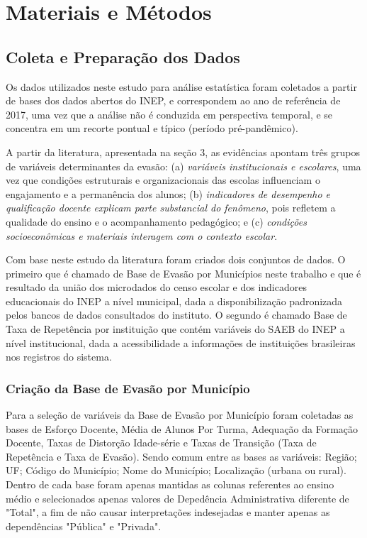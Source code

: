 \documentclass[english, spanish, brazilian]{RBIEarticle} %
\begin{document}
\section{Materiais e Métodos}

\subsection{Coleta e Preparação dos Dados}

Os dados utilizados neste estudo para análise estatística foram coletados a partir de bases dos  dados abertos do INEP, e correspondem ao ano de referência de 2017, uma vez que a análise não é conduzida em perspectiva temporal, e se concentra em um recorte pontual e típico (período pré-pandêmico).

A partir da literatura, apresentada na seção 3, as evidências apontam três grupos de variáveis determinantes da evasão: (a) \textit{variáveis institucionais e escolares}, uma vez que condições estruturais e organizacionais das escolas influenciam o engajamento e a permanência dos alunos; (b) \textit{indicadores de desempenho e qualificação docente explicam parte substancial do fenômeno}, pois refletem a qualidade do ensino e o acompanhamento pedagógico; e (c) \textit{condições socioeconômicas e materiais interagem com o contexto escolar}. 

Com base neste estudo da literatura foram criados dois conjuntos de dados. O primeiro que é chamado de Base de Evasão por Municípios neste trabalho e que é resultado da união dos microdados do censo escolar e dos indicadores educacionais do INEP a nível municipal, dada a disponibilização padronizada pelos bancos de dados consultados do instituto. O segundo é chamado Base de Taxa de Repetência por instituição que contém variáveis do SAEB do INEP a nível institucional, dada a acessibilidade a informações de instituições brasileiras nos registros do sistema.

\subsubsection{Criação da Base de Evasão por Município}
Para a seleção de variáveis da Base de Evasão por Município foram coletadas as bases de Esforço Docente, Média de Alunos Por Turma, Adequação da Formação Docente, Taxas de Distorção Idade-série e Taxas de Transição (Taxa de Repetência e Taxa de Evasão). Sendo comum entre as bases as variáveis: Região; UF; Código do Município; Nome do Município; Localização (urbana ou rural). Dentro de cada base foram apenas mantidas as colunas referentes ao ensino médio e selecionados apenas valores de Depedência Administrativa diferente de "Total", a fim de não causar interpretações indesejadas e manter apenas as dependências "Pública" e "Privada".
\end{document}

